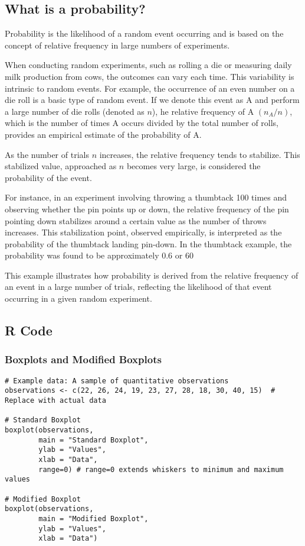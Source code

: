 \documentclass{article}
\begin{document}
\subsection{What is a probability?}

Probability is the likelihood of a random event occurring and is based on the concept of relative frequency in large numbers of experiments.

When conducting random experiments, such as rolling a die or measuring daily milk production from cows, the outcomes can vary each time. This variability is intrinsic to random events. For example, the occurrence of an even number on a die roll is a basic type of random event. If we denote this event as A and perform a large number of die rolls (denoted as $n$), he relative frequency of A $(n_A/n)$, which is the number of times A occurs divided by the total number of rolls, provides an empirical estimate of the probability of A.

As the number of trials $n$ increases, the relative frequency tends to stabilize. This stabilized value, approached as $n$ becomes very large, is considered the probability of the event.

For instance, in an experiment involving throwing a thumbtack 100 times and observing whether the pin points up or down, the relative frequency of the pin pointing down stabilizes around a certain value as the number of throws increases. This stabilization point, observed empirically, is interpreted as the probability of the thumbtack landing pin-down. In the thumbtack example, the probability was found to be approximately 0.6 or 60%

This example illustrates how probability is derived from the relative frequency of an event in a large number of trials, reflecting the likelihood of that event occurring in a given random experiment.
\pagebreak

\subsection{R Code}

\subsubsection*{Boxplots and Modified Boxplots}

\begin{lstlisting}
# Example data: A sample of quantitative observations
observations <- c(22, 26, 24, 19, 23, 27, 28, 18, 30, 40, 15)  # Replace with actual data

# Standard Boxplot
boxplot(observations, 
        main = "Standard Boxplot", 
        ylab = "Values",
        xlab = "Data",
        range=0) # range=0 extends whiskers to minimum and maximum values

# Modified Boxplot
boxplot(observations, 
        main = "Modified Boxplot", 
        ylab = "Values",
        xlab = "Data")
\end{lstlisting}
\end{document}
